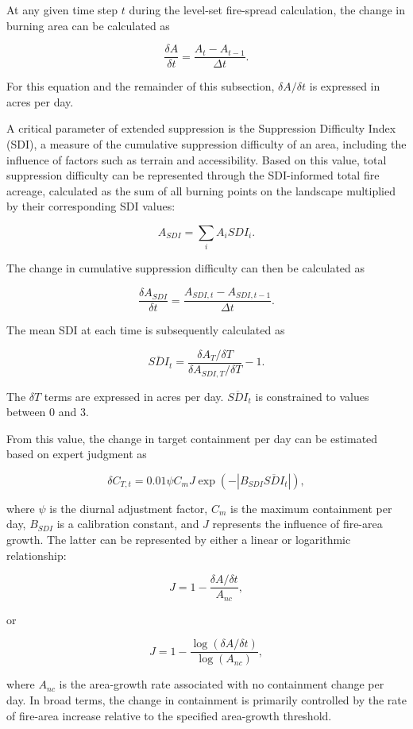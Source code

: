 At any given time step $t$ during the level-set fire-spread calculation, the
change in burning area can be calculated as

\[
\frac{\delta A}{\delta t}
=
\frac{A_t-A_{t-1}}{\Delta t}.
\]

For this equation and the remainder of this subsection,
$\delta A/\delta t$ is expressed in acres per day.

A critical parameter of extended suppression is the Suppression Difficulty
Index (SDI), a measure of the cumulative suppression difficulty of an area,
including the influence of factors such as terrain and accessibility. Based on
this value, total suppression difficulty can be represented through the
SDI-informed total fire acreage, calculated as the sum of all burning points on
the landscape multiplied by their corresponding SDI values:

\[
A_{SDI}
=
\sum_i A_i SDI_i.
\]

The change in cumulative suppression difficulty can then be calculated as

\[
\frac{\delta A_{SDI}}{\delta t}
=
\frac{A_{SDI,t}-A_{SDI,t-1}}{\Delta t}.
\]

The mean SDI at each time is subsequently calculated as

\[
\overline{SDI}_t
=
\frac{\delta A_T/\delta T}
     {\delta A_{SDI,T}/\delta T}
-1.
\]

The $\delta T$ terms are expressed in acres per day.
$\overline{SDI}_t$ is constrained to values between 0 and 3.

From this value, the change in target containment per day can be estimated based
on expert judgment as

\[
\delta C_{T,t}
=
0.01\psi C_m J
\exp\left(
-\left|B_{SDI}\overline{SDI}_t\right|
\right),
\]

where $\psi$ is the diurnal adjustment factor, $C_m$ is the maximum containment
per day, $B_{SDI}$ is a calibration constant, and $J$ represents the influence
of fire-area growth. The latter can be represented by either a linear or
logarithmic relationship:

\[
J
=
1-
\frac{\delta A/\delta t}{A_{nc}},
\]

or

\[
J
=
1-
\frac{\log(\delta A/\delta t)}
     {\log(A_{nc})},
\]

where $A_{nc}$ is the area-growth rate associated with no containment change
per day. In broad terms, the change in containment is primarily controlled by
the rate of fire-area increase relative to the specified area-growth threshold.

